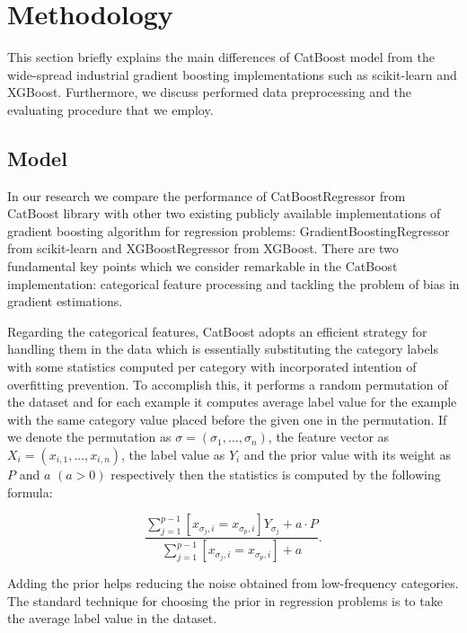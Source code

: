 \section{Methodology}
\label{sec:methodology}

This section briefly explains the main differences of CatBoost model from the wide-spread industrial gradient boosting implementations such as scikit-learn and XGBoost. Furthermore, we discuss performed data preprocessing and the evaluating procedure that we employ.

\subsection{Model}

In our research we compare the performance of CatBoostRegressor from CatBoost library with other two existing publicly available implementations of gradient boosting algorithm for regression problems: GradientBoostingRegressor from scikit-learn and XGBoostRegressor from XGBoost. There are two fundamental key points which we consider remarkable in the CatBoost implementation: categorical feature processing and tackling the problem of bias in gradient estimations. 

Regarding the categorical features, CatBoost adopts an efficient strategy for handling them in the data which is essentially substituting the category labels with some statistics computed per category with incorporated intention of overfitting prevention. To accomplish this, it performs a random permutation of the dataset and for each example it computes average label value for the example with the same category value placed before the given one in the permutation. 
If we denote the permutation as $ \sigma = (\sigma_1, ..., \sigma_n)$, the feature vector as $ X_i = (x_{i, 1}, ..., x_{i, n})$, the label value as $Y_i$ and the prior value with its weight as $P$ and $a$ $(a > 0)$ respectively then the statistics is computed by the following formula:

$$ \frac{\sum_{j=1}^{p-1} [ x_{\sigma_j, i} = x_{\sigma_p, i}] Y_{\sigma_j} + a \cdot P}{\sum_{j=1}^{p-1} [ x_{\sigma_j, i} = x_{\sigma_p, i}] + a }. $$

Adding the prior helps reducing the noise obtained from low-frequency categories. The standard technique for choosing the prior in regression problems is to take the average label value in the dataset.

